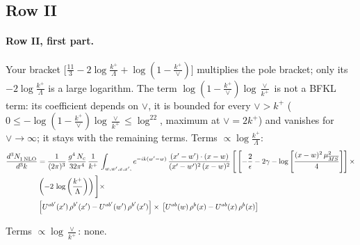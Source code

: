 \documentclass[10pt]{article}
\numberwithin{equation}{section}
\begin{document}
\subsection{Row II}
\paragraph{Row II, first part.}
Your bracket $\big[\frac{11}{3}-2\log\frac{k^+}{\Lambda}+\log(1-\frac{k^+}{\vee})\big]$ multiplies the pole bracket; only its $-2\log\frac{k^+}{\Lambda}$ is a large logarithm. The term $\log(1-\frac{k^+}{\vee})\log\frac{\vee}{k^+}$ is not a BFKL term: its coefficient depends on $\vee$, it is bounded for every $\vee>k^+$ ($0\le-\log(1-\frac{k^+}{\vee})\log\frac{\vee}{k^+}\le\log^22$, maximum at $\vee=2k^+$) and vanishes for $\vee\to\infty$; it stays with the remaining terms.
\noindent Terms $\propto\log\frac{k^+}{\Lambda}$:
\begin{align}
     \frac{d^{3}N_{1\,\rm NLO}^{\rm}}{d^{3}k} &  =  \frac{1}{(2\pi)^{3}}\, \frac{g^{4}\,N_{c}}{32\pi^{4}}\,\frac{1}{k^{+}}\, \int_{w, w',x,x',} e^{-ik(w^\prime-w)}\, \frac{(x'-w')\cdot (x-w)}{(x'-w')^{2}\, (x-w)^{2}}\, \Bigg[\left[-\frac{2}{\epsilon}-2\gamma-\log{\left[\frac{(x-w)^{2}\,\mu^{2}_{\overline{MS}}}{4}\right]}\right]\times \notag \\ & \left(-2\,\log{\left(\frac{k^{+}}{\Lambda}\right)}\right)\Bigg]\times\notag \\ & \left[U^{ab'}(x')\,\rho^{b'}(x') - U^{ab'}(w')\,\rho^{b'}(x')\right]\times\,\left[U^{ab}(w)\,\rho^{b}(x) - U^{ab}(x)\,\rho^{b}(x)\right] \label{eq:J:G1II1}
\end{align}

\noindent Terms $\propto\log\frac{\vee}{k^+}$: none.
\end{document}
